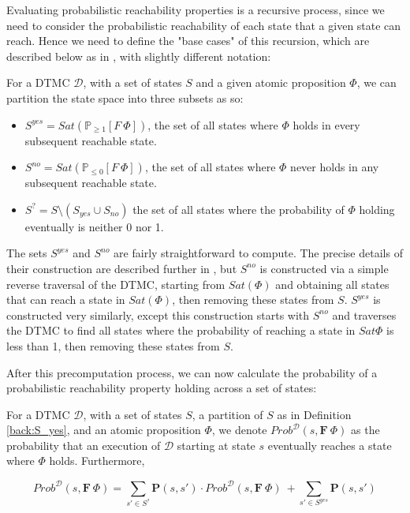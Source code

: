 Evaluating probabilistic reachability properties is a recursive process, since we need to consider the probabilistic reachability of each state that a given state can reach. Hence we need to define the "base cases" of this recursion, which are described below as in \cite{kwiatkowska_stochastic_2007}, with slightly different notation:

\begin{definition}
\label{back:S_yes}

    For a DTMC $\mathcal{D}$, with a set of states $S$ and a given atomic proposition $\Phi$, we can partition the state space into three subsets as so:

    \begin{itemize}
        
        \item $S^{yes} = Sat(\mathbb{P}_{\geq 1}[F \: \Phi])$, the set of all states where $\Phi$ holds in every subsequent reachable state.
        \item $S^{no} = Sat(\mathbb{P}_{\leq 0}[F \: \Phi])$, the set of all states where $\Phi$ never holds in any subsequent reachable state.
        \item $S^{?} = S \setminus (S_{yes} \cup S_{no})$ the set of all states where the probability of $\Phi$ holding eventually is neither 0 nor 1.

    \end{itemize}

\end{definition}

The sets $S^{yes}$ and $S^{no}$ are fairly straightforward to compute. The precise details of their construction are described further in \cite{kwiatkowska_stochastic_2007}, but $S^{no}$ is constructed via a simple reverse traversal of the DTMC, starting from $Sat(\Phi)$ and obtaining all states that can reach a state in $Sat(\Phi)$, then removing these states from $S$. $S^{yes}$ is constructed very similarly, except this construction starts with $S^{no}$ and traverses the DTMC to find all states where the probability of reaching a state in $Sat{\Phi}$ is less than 1, then removing these states from $S$.

After this precomputation process, we can now calculate the probability of a probabilistic reachability property holding across a set of states:

\begin{definition}
\label{back:F_operator}

    For a DTMC $\mathcal{D}$, with a set of states $S$, a partition of $S$ as in Definition \ref{back:S_yes}, and an atomic proposition $\Phi$, we denote $Prob^{\mathcal{D}}(s, \mathbf{F} \: \Phi)$ as the probability that an execution of $\mathcal{D}$ starting at state $s$ eventually reaches a state where $\Phi$ holds. Furthermore,

    \begin{equation*}
        Prob^{\mathcal{D}}(s, \mathbf{F} \: \Phi) = \sum_{s' \in S^{?}} \mathbf{P}(s, s') \cdot Prob^{\mathcal{D}}(s, \mathbf{F} \: \Phi) \: + \sum_{s' \in S^{yes}} \mathbf{P}(s, s')
    \end{equation*}
    
\end{definition}

